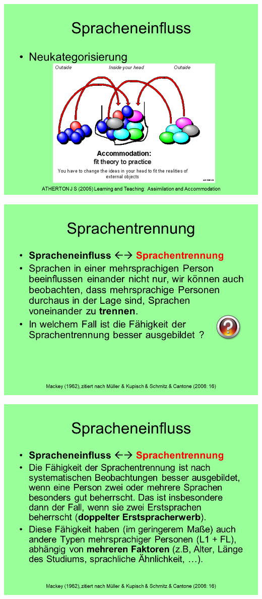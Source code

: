 \documentclass[
  letterpaper,
]{scrbook}
\begin{document}
\includegraphics[width=1\textwidth,height=\textheight]{./pictures/02_Spracheneinfluss_Sprachentrennung/Diapozitiv22.PNG}

\includegraphics[width=1\textwidth,height=\textheight]{./pictures/02_Spracheneinfluss_Sprachentrennung/Diapozitiv23.PNG}

\includegraphics[width=1\textwidth,height=\textheight]{./pictures/02_Spracheneinfluss_Sprachentrennung/Diapozitiv24.PNG}
\end{document}
